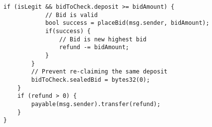 \begin{lstlisting}[language=Solidity]
		if (isLegit && bidToCheck.deposit >= bidAmount) {
			// Bid is valid
			bool success = placeBid(msg.sender, bidAmount);
			if(success) {
				// Bid is new highest bid
				refund -= bidAmount;
			}
		}
		// Prevent re-claiming the same deposit
		bidToCheck.sealedBid = bytes32(0);
	}
	if (refund > 0) {
		payable(msg.sender).transfer(refund);
	}
}
\end{lstlisting}